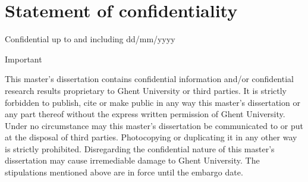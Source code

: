 \chapter*{Statement of confidentiality}

Confidential up to and including dd/mm/yyyy

Important

This master’s dissertation contains confidential information and/or confidential research results proprietary to Ghent University or third parties. It is strictly forbidden to publish, cite or make public in any way this master’s dissertation or any part thereof without the express written permission of Ghent University. Under no circumstance may this master’s dissertation be communicated to or put at the disposal of third parties. Photocopying or duplicating it in any other way is strictly prohibited. Disregarding the confidential nature of this master’s dissertation may cause irremediable damage to Ghent University. The stipulations mentioned above are in force until the embargo date.

%
%
%
